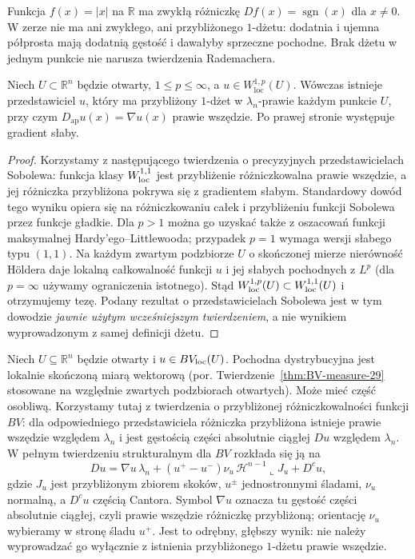 \begin{przyklad}
Funkcja $f(x)=|x|$ na $\mathbb R$ ma zwykłą różniczkę
$Df(x)=\operatorname{sgn}(x)$ dla $x\ne0$.
W zerze nie ma ani zwykłego, ani przybliżonego
$1$-dżetu: dodatnia i ujemna półprosta mają dodatnią
gęstość i dawałyby sprzeczne pochodne. Brak dżetu w jednym
punkcie nie narusza twierdzenia Rademachera.
\end{przyklad}

\begin{twierdzenie}
\label{thm:dzety-sobolev}
Niech $U\subset\mathbb R^n$ będzie otwarty,
$1\le p\le\infty$, a $u\in W_{\mathrm{loc}}^{1,p}(U)$.
Wówczas istnieje przedstawiciel $u$, który ma
przybliżony $1$-dżet w $\lambda_n$-prawie każdym
punkcie $U$, przy czym
$D_{\mathrm{ap}}u(x)=\nabla u(x)$ prawie wszędzie.
Po prawej stronie występuje gradient słaby.
\end{twierdzenie}
\begin{proof}
Korzystamy z następującego twierdzenia o precyzyjnych
przedstawicielach Sobolewa: funkcja klasy $W^{1,1}_{\rm loc}$
jest przybliżenie różniczkowalna prawie wszędzie, a jej
różniczka przybliżona pokrywa się z gradientem słabym.
Standardowy dowód tego wyniku opiera się na różniczkowaniu
całek i przybliżeniu funkcji Sobolewa przez funkcje gładkie.
Dla $p>1$ można go uzyskać także z oszacowań funkcji
maksymalnej Hardy'ego--Littlewooda; przypadek $p=1$
wymaga wersji słabego typu $(1,1)$. Na każdym zwartym podzbiorze $U$ o skończonej
mierze nierówność Höldera daje lokalną całkowalność
funkcji $u$ i jej słabych pochodnych z $L^p$
(dla $p=\infty$ używamy ograniczenia istotnego).
Stąd $W^{1,p}_{\rm loc}(U)\subset W^{1,1}_{\rm loc}(U)$
i otrzymujemy tezę. Podany rezultat o przedstawicielach
Sobolewa jest w tym dowodzie \emph{jawnie użytym
wcześniejszym twierdzeniem}, a nie wynikiem wyprowadzonym
z samej definicji dżetu.
\end{proof}

\begin{uwaga}
\label{rem:dzety-bv}
Niech $U\subseteq\mathbb R^n$ będzie otwarty
i $u\in BV_{\rm loc}(U)$. Pochodna dystrybucyjna
jest lokalnie skończoną miarą wektorową
(por. Twierdzenie~\ref{thm:BV-measure-29} stosowane
na względnie zwartych podzbiorach otwartych).
Może mieć część osobliwą. Korzystamy tutaj z
twierdzenia o przybliżonej różniczkowalności funkcji
$BV$: dla odpowiedniego przedstawiciela różniczka
przybliżona istnieje prawie wszędzie względem
$\lambda_n$ i jest gęstością części absolutnie ciągłej
$Du$ względem $\lambda_n$. W pełnym twierdzeniu
strukturalnym dla $BV$ rozkłada się ją na
\[
 Du=\nabla u\,\lambda_n
 +(u^+-u^-)\nu_u\,\mathcal H^{n-1}\llcorner J_u+D^cu,
\]
gdzie $J_u$ jest przybliżonym zbiorem skoków,
$u^\pm$ jednostronnymi śladami, $\nu_u$ normalną,
a $D^cu$ częścią Cantora. Symbol $\nabla u$ oznacza
tu gęstość części absolutnie ciągłej, czyli prawie
wszędzie różniczkę przybliżoną; orientację $\nu_u$
wybieramy w stronę śladu $u^+$.
Jest to odrębny, głębszy wynik:
nie należy wyprowadzać go wyłącznie z istnienia
przybliżonego $1$-dżetu prawie wszędzie.
\end{uwaga}

